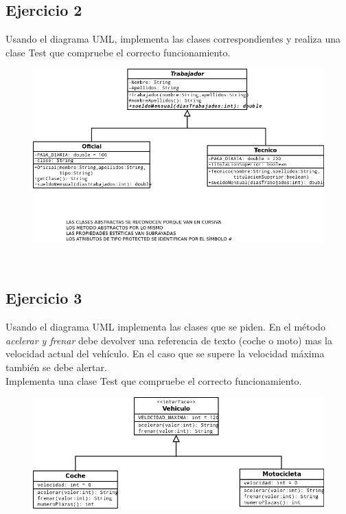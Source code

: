 \documentclass[4paper]{article}
\begin{document}
\subsection*{Ejercicio 2}
Usando el diagrama UML, implementa las clases correspondientes y realiza una clase Test que compruebe el correcto funcionamiento.
\\ 
\vspace*{0.2cm}
\begin{figure}[h]
\includegraphics[scale=0.4]{herencia.png}
\end{figure}
\\ 
\vspace*{0.2cm}

\newpage
\subsection*{Ejercicio 3}
Usando el diagrama UML implementa las clases que se piden. En el método \emph{acelerar y frenar} debe devolver una referencia de texto (coche o moto) mas la velocidad actual del vehículo. En el caso que se supere la velocidad máxima también se debe alertar.
\\ 
Implementa una clase Test que compruebe el correcto funcionamiento.
\vspace*{0.2cm}
\begin{figure}[h]
\includegraphics[scale=0.4]{interfaces.png}
\end{figure}
\\ 
\vspace*{0.2cm}
\end{document}
